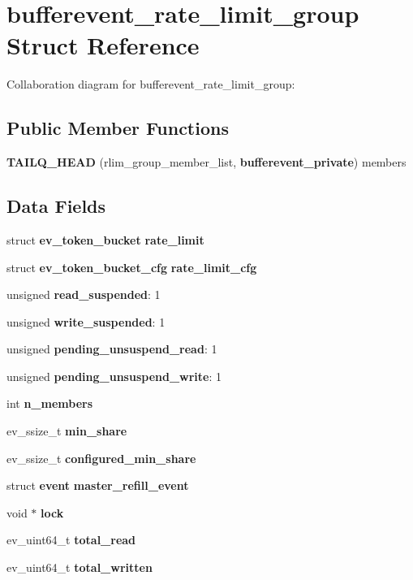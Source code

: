 \section{bufferevent\-\_\-rate\-\_\-limit\-\_\-group \-Struct \-Reference}
\label{structbufferevent__rate__limit__group}


\-Collaboration diagram for bufferevent\-\_\-rate\-\_\-limit\-\_\-group\-:
\subsection*{\-Public \-Member \-Functions}
\begin{DoxyCompactItemize}
\item 
{\bf \-T\-A\-I\-L\-Q\-\_\-\-H\-E\-A\-D} (rlim\-\_\-group\-\_\-member\-\_\-list, {\bf bufferevent\-\_\-private}) members
\end{DoxyCompactItemize}
\subsection*{\-Data \-Fields}
\begin{DoxyCompactItemize}
\item 
struct {\bf ev\-\_\-token\-\_\-bucket} {\bf rate\-\_\-limit}
\item 
struct {\bf ev\-\_\-token\-\_\-bucket\-\_\-cfg} {\bfseries rate\-\_\-limit\-\_\-cfg}\label{structbufferevent__rate__limit__group_ab743572cd44a4c8c60b31897088c3116}

\item 
unsigned {\bf read\-\_\-suspended}\-: 1
\item 
unsigned {\bf write\-\_\-suspended}\-: 1
\item 
unsigned {\bf pending\-\_\-unsuspend\-\_\-read}\-: 1
\item 
unsigned {\bf pending\-\_\-unsuspend\-\_\-write}\-: 1
\item 
int {\bf n\-\_\-members}
\item 
ev\-\_\-ssize\-\_\-t {\bf min\-\_\-share}
\item 
ev\-\_\-ssize\-\_\-t {\bfseries configured\-\_\-min\-\_\-share}\label{structbufferevent__rate__limit__group_aaba3dc0f03df075bf7883648b17a95f6}

\item 
struct {\bf event} {\bf master\-\_\-refill\-\_\-event}
\item 
void $\ast$ {\bf lock}
\end{DoxyCompactItemize}
{\bf }\par
\begin{DoxyCompactItemize}
\item 
ev\-\_\-uint64\-\_\-t {\bf total\-\_\-read}
\item 
ev\-\_\-uint64\-\_\-t {\bfseries total\-\_\-written}\label{structbufferevent__rate__limit__group_a1e4ec1b59d457cc7389c0cc209516a99}

\end{DoxyCompactItemize}



